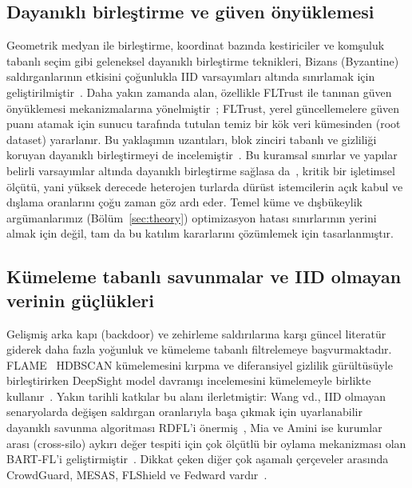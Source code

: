 \documentclass[journal]{IEEEtran}
\begin{document}
\subsection{Dayanıklı birleştirme ve güven önyüklemesi}
Geometrik medyan ile birleştirme, koordinat bazında kestiriciler ve komşuluk tabanlı seçim gibi geleneksel dayanıklı birleştirme teknikleri, Bizans (Byzantine) saldırganlarının etkisini çoğunlukla IID varsayımları altında sınırlamak için geliştirilmiştir~\cite{blanchard2017,yin2018,pillutla2022rfa}. Daha yakın zamanda alan, özellikle FLTrust ile tanınan güven önyüklemesi mekanizmalarına yönelmiştir~\cite{cao2021fltrust}; FLTrust, yerel güncellemelere güven puanı atamak için sunucu tarafında tutulan temiz bir kök veri kümesinden (root dataset) yararlanır. Bu yaklaşımın uzantıları, blok zinciri tabanlı ve gizliliği koruyan dayanıklı birleştirmeyi de incelemiştir~\cite{miao2022privacy}. Bu kuramsal sınırlar ve yapılar belirli varsayımlar altında dayanıklı birleştirme sağlasa da~\cite{karimireddy2022bucketing,allouah2023mixing}, kritik bir işletimsel ölçütü, yani yüksek derecede heterojen turlarda dürüst istemcilerin açık kabul ve dışlama oranlarını çoğu zaman göz ardı eder. Temel küme ve dışbükeylik argümanlarımız (Bölüm~\ref{sec:theory}) optimizasyon hatası sınırlarının yerini almak için değil, tam da bu katılım kararlarını çözümlemek için tasarlanmıştır.

\subsection{Kümeleme tabanlı savunmalar ve IID olmayan verinin güçlükleri}
Gelişmiş arka kapı (backdoor) ve zehirleme saldırılarına karşı güncel literatür giderek daha fazla yoğunluk ve kümeleme tabanlı filtrelemeye başvurmaktadır. FLAME~\cite{nguyen2022flame} HDBSCAN kümelemesini kırpma ve diferansiyel gizlilik gürültüsüyle birleştirirken DeepSight model davranışı incelemesini kümelemeyle birlikte kullanır~\cite{rieger2022deepsight}. Yakın tarihli katkılar bu alanı ilerletmiştir: Wang vd., IID olmayan senaryolarda değişen saldırgan oranlarıyla başa çıkmak için uyarlanabilir dayanıklı savunma algoritması RDFL'i önermiş~\cite{wang2023adaptive}, Mia ve Amini ise kurumlar arası (cross-silo) aykırı değer tespiti için çok ölçütlü bir oylama mekanizması olan BART-FL'i geliştirmiştir~\cite{mia2025bart}. Dikkat çeken diğer çok aşamalı çerçeveler arasında CrowdGuard, MESAS, FLShield ve Fedward vardır~\cite{rieger2024crowdguard,krauss2023mesas,kabir2023flshield,chen2023fedward}.
\end{document}
